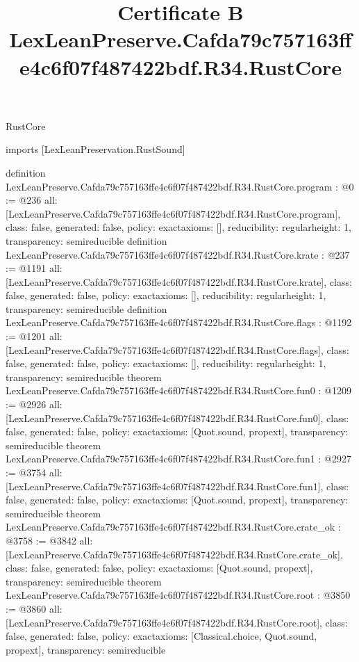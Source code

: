 \begin{lexlean}{RustCore}
\title{Certificate B LexLeanPreserve.Cafda79c757163ffe4c6f07f487422bdf.R34.RustCore}
\begin{coremodule}
imports [LexLeanPreservation.RustSound]

definition LexLeanPreserve.Cafda79c757163ffe4c6f07f487422bdf.R34.RustCore.program : @0 := @236 {
  all: [LexLeanPreserve.Cafda79c757163ffe4c6f07f487422bdf.R34.RustCore.program],
  class: false,
  generated: false,
  policy: exact{axioms: []},
  reducibility: regular{height: 1},
  transparency: semireducible
}
definition LexLeanPreserve.Cafda79c757163ffe4c6f07f487422bdf.R34.RustCore.krate : @237 := @1191 {
  all: [LexLeanPreserve.Cafda79c757163ffe4c6f07f487422bdf.R34.RustCore.krate],
  class: false,
  generated: false,
  policy: exact{axioms: []},
  reducibility: regular{height: 1},
  transparency: semireducible
}
definition LexLeanPreserve.Cafda79c757163ffe4c6f07f487422bdf.R34.RustCore.flags : @1192 := @1201 {
  all: [LexLeanPreserve.Cafda79c757163ffe4c6f07f487422bdf.R34.RustCore.flags],
  class: false,
  generated: false,
  policy: exact{axioms: []},
  reducibility: regular{height: 1},
  transparency: semireducible
}
theorem LexLeanPreserve.Cafda79c757163ffe4c6f07f487422bdf.R34.RustCore.fun0 : @1209 := @2926 {
  all: [LexLeanPreserve.Cafda79c757163ffe4c6f07f487422bdf.R34.RustCore.fun0],
  class: false,
  generated: false,
  policy: exact{axioms: [Quot.sound, propext]},
  transparency: semireducible
}
theorem LexLeanPreserve.Cafda79c757163ffe4c6f07f487422bdf.R34.RustCore.fun1 : @2927 := @3754 {
  all: [LexLeanPreserve.Cafda79c757163ffe4c6f07f487422bdf.R34.RustCore.fun1],
  class: false,
  generated: false,
  policy: exact{axioms: [Quot.sound, propext]},
  transparency: semireducible
}
theorem LexLeanPreserve.Cafda79c757163ffe4c6f07f487422bdf.R34.RustCore.crate_ok : @3758 := @3842 {
  all: [LexLeanPreserve.Cafda79c757163ffe4c6f07f487422bdf.R34.RustCore.crate_ok],
  class: false,
  generated: false,
  policy: exact{axioms: [Quot.sound, propext]},
  transparency: semireducible
}
theorem LexLeanPreserve.Cafda79c757163ffe4c6f07f487422bdf.R34.RustCore.root : @3850 := @3860 {
  all: [LexLeanPreserve.Cafda79c757163ffe4c6f07f487422bdf.R34.RustCore.root],
  class: false,
  generated: false,
  policy: exact{axioms: [Classical.choice, Quot.sound, propext]},
  transparency: semireducible
}


\end{coremodule}
\end{lexlean}
